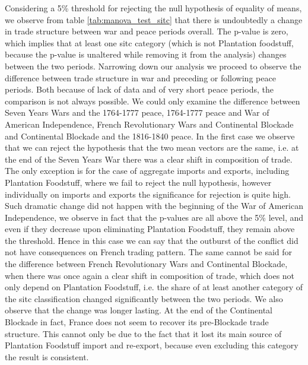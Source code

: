 \documentclass[12pt,a4paper,notitlepage,english]{article}
\begin{document}
Considering a 5\% threshold for rejecting the null hypothesis of equality of means, we observe from table \ref{tab:manova_test_sitc} that there is undoubtedly a change in trade structure between war and peace periods overall. The p-value is zero, which implies that at least one sitc category (which is not Plantation foodstuff, because the p-value is unaltered while removing it from the analysis) changes between the two periods. Narrowing down our analysis we proceed to observe the difference between trade structure in war and preceding or following peace periods. Both because of lack of data and of very short peace periods, the comparison is not always possible. We could only examine the difference between Seven Years Wars and the 1764-1777 peace, 1764-1777 peace and War of American Independence, French Revolutionary Wars and Continental Blockade and Continental Blockade and the 1816-1840 peace. In the first case we observe that we can reject the hypothesis that the two mean vectors are the same, i.e. at the end of the Seven Years War there was a clear shift in composition of trade. The only exception is for the case of aggregate imports and exports, including Plantation Foodstuff, where we fail to reject the null hypothesis, however individually on imports and exports the significance for rejection is quite high. Such dramatic change did not happen with the beginning of the War of American Independence, we observe in fact that the p-values are all above the 5\% level, and even if they decrease upon eliminating Plantation Foodstuff, they remain above the threshold. Hence in this case we can say that the outburst of the conflict did not have consequences on French trading pattern. The same cannot be said for the difference between French Revolutionary Wars and Continental Blockade, when there was once again a clear shift in composition of trade, which does not only depend on Plantation Foodstuff, i.e. the share of at least another category of the sitc classification changed significantly between the two periods. We also observe that the change was longer lasting. At the end of the Continental Blockade in fact, France does not seem to recover its pre-Blockade trade structure. This cannot only be due to the fact that it lost its main source of Plantation Foodstuff import and re-export, because even excluding this category the result is consistent. 




%
\end{document}
